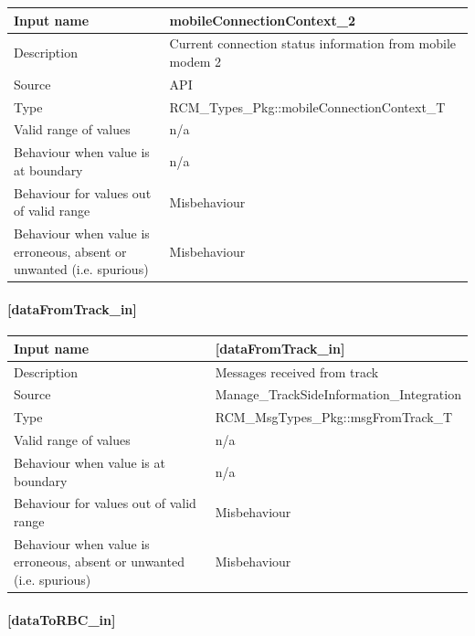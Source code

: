 \begin{longtable}{p{}p{}}
	\toprule
	Input name				& mobileConnectionContext\_2 \\
	\midrule
	Description				& Current connection status information from mobile modem 2 \\
	\midrule
	Source					& API \\ 
	\midrule
	Type					& RCM\_Types\_Pkg::mobileConnectionContext\_T \\
	\midrule
	Valid range of values	& n/a \\
	\midrule
	Behaviour when value is at boundary	& n/a \\
	\midrule
	Behaviour for values out of valid range	& Misbehaviour \\
	\midrule
	Behaviour when value is erroneous, absent or unwanted (i.e. spurious) & Misbehaviour \\
	\bottomrule
\end{longtable}

\paragraph{[dataFromTrack\_in]}

\begin{longtable}{p{}p{}}
	\toprule
	Input name				& [dataFromTrack\_in] \\
	\midrule
	Description				& Messages received from track \\
	\midrule
	Source					&  Manage\_TrackSideInformation\_Integration \\ 
	\midrule
	Type					& RCM\_MsgTypes\_Pkg::msgFromTrack\_T \\
	\midrule
	Valid range of values	& n/a \\
	\midrule
	Behaviour when value is at boundary	& n/a \\
	\midrule
	Behaviour for values out of valid range	& Misbehaviour \\
	\midrule
	Behaviour when value is erroneous, absent or unwanted (i.e. spurious) & Misbehaviour \\
	\bottomrule
\end{longtable}

\paragraph{[dataToRBC\_in]}


